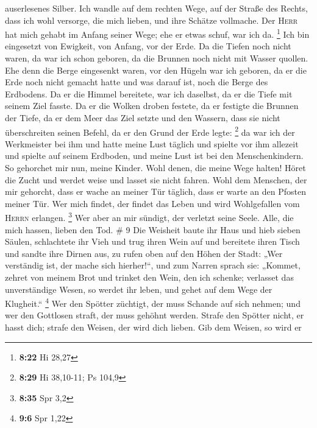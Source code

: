 auserlesenes Silber.  Ich wandle auf dem rechten Wege,
auf der Straße des Rechts,  dass ich wohl versorge, die
mich lieben, und ihre Schätze vollmache.  Der
\textsc{Herr} hat mich gehabt im Anfang seiner Wege; ehe er etwas schuf,
war ich da. \footnote{\textbf{8:22} Hi 28,27}  Ich bin
eingesetzt von Ewigkeit, von Anfang, vor der Erde.  Da
die Tiefen noch nicht waren, da war ich schon geboren, da die Brunnen
noch nicht mit Wasser quollen.  Ehe denn die Berge
eingesenkt waren, vor den Hügeln war ich geboren,  da er
die Erde noch nicht gemacht hatte und was darauf ist, noch die Berge des
Erdbodens.  Da er die Himmel bereitete, war ich daselbst,
da er die Tiefe mit seinem Ziel fasste.  Da er die Wolken
droben festete, da er festigte die Brunnen der Tiefe,  da
er dem Meer das Ziel setzte und den Wassern, dass sie nicht
überschreiten seinen Befehl, da er den Grund der Erde legte: \footnote{\textbf{8:29}
  Hi 38,10-11; Ps 104,9}  da war ich der Werkmeister bei
ihm und hatte meine Lust täglich und spielte vor ihm allezeit
 und spielte auf seinem Erdboden, und meine Lust ist bei
den Menschenkindern.  So gehorchet mir nun, meine Kinder.
Wohl denen, die meine Wege halten!  Höret die Zucht und
werdet weise und lasset sie nicht fahren.  Wohl dem
Menschen, der mir gehorcht, dass er wache an meiner Tür täglich, dass er
warte an den Pfosten meiner Tür.  Wer mich findet, der
findet das Leben und wird Wohlgefallen vom \textsc{Herrn} erlangen.
\footnote{\textbf{8:35} Spr 3,2}  Wer aber an mir
sündigt, der verletzt seine Seele. Alle, die mich hassen, lieben den
Tod. \# 9  Die Weisheit baute ihr Haus und hieb sieben
Säulen,  schlachtete ihr Vieh und trug ihren Wein auf und
bereitete ihren Tisch  und sandte ihre Dirnen aus, zu
rufen oben auf den Höhen der Stadt:  „Wer verständig ist,
der mache sich hierher!{}``, und zum Narren sprach sie: 
„Kommet, zehret von meinem Brot und trinket den Wein, den ich schenke;
 verlasset das unverständige Wesen, so werdet ihr leben,
und gehet auf dem Wege der Klugheit.`` \footnote{\textbf{9:6} Spr 1,22}
 Wer den Spötter züchtigt, der muss Schande auf sich
nehmen; und wer den Gottlosen straft, der muss gehöhnt werden.
 Strafe den Spötter nicht, er hasst dich; strafe den
Weisen, der wird dich lieben.  Gib dem Weisen, so wird er
